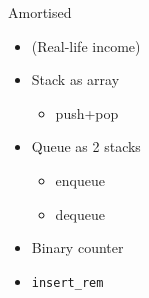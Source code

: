 \documentclass[aspectratio=169]{beamer}
\begin{document}
\begin{frame}[t]
{\begin{alertblock}{Amortised}
    \begin{itemize}
    \item (Real-life income)
    \item Stack as array
      \begin{itemize}
        \item push+pop
      \end{itemize}
    \item Queue as 2 stacks
      \begin{itemize}
        \item enqueue
        \item dequeue
      \end{itemize}
    \item Binary counter
    \item \texttt{insert\_rem}
    \end{itemize}
  \end{alertblock}
 }

\end{frame}
\end{document}
